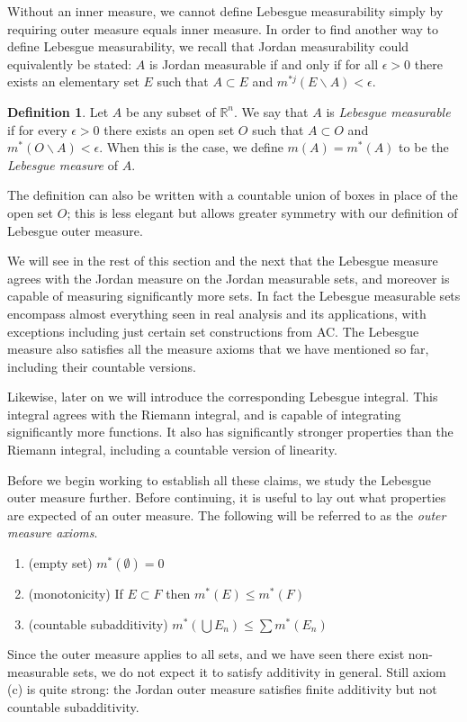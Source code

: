 \documentclass[11pt,oneside]{amsbook}
\renewcommand{\setminus}{\smallsetminus}
\newcommand{\RR}{{\mathbb R}}
\theoremstyle{definition}
\theoremstyle{plain}
\theoremstyle{definition}
\newtheorem{defn}[thm]{Definition}
\theoremstyle{remark}
\numberwithin{equation}{section}
\numberwithin{figure}{section}
\begin{document}
Without an inner measure, we cannot define Lebesgue measurability simply by requiring outer measure equals inner measure. In order to find another way to define Lebesgue measurability, we recall that Jordan measurability could equivalently be stated: $A$ is Jordan measurable if and only if for all $\epsilon>0$ there exists an elementary set $E$ such that $A\subset E$ and $m^{*j}(E\setminus A)<\epsilon$.

\begin{defn}
  Let $A$ be any subset of $\RR^n$. We say that $A$ is \emph{Lebesgue measurable} if for every $\epsilon>0$ there exists an open set $O$ such that $A\subset O$ and $m^*(O\setminus A)<\epsilon$. When this is the case, we define $m(A)=m^*(A)$ to be the \emph{Lebesgue measure} of $A$.
\end{defn}

The definition can also be written with a countable union of boxes in place of the open set $O$; this is less elegant but allows greater symmetry with our definition of Lebesgue outer measure.

We will see in the rest of this section and the next that the Lebesgue measure agrees with the Jordan measure on the Jordan measurable sets, and moreover is capable of measuring significantly more sets. In fact the Lebesgue measurable sets encompass almost everything seen in real analysis and its applications, with exceptions including just certain set constructions from AC.  The Lebesgue measure also satisfies all the measure axioms that we have mentioned so far, including their countable versions.

Likewise, later on we will introduce the corresponding Lebesgue integral. This integral agrees with the Riemann integral, and is capable of integrating significantly more functions. It also has significantly stronger properties than the Riemann integral, including a countable version of linearity.

Before we begin working to establish all these claims, we study the Lebesgue outer measure further. Before continuing, it is useful to lay out what properties are expected of an outer measure. The following will be referred to as the \emph{outer measure axioms}.
\begin{enumerate}
\item (empty set) $m^*(\emptyset)=0$
\item (monotonicity) If $E\subset F$ then $m^*(E)\leq m^*(F)$
\item (countable subadditivity) $m^*(\bigcup E_n)\leq\sum m^*(E_n)$
\end{enumerate}
Since the outer measure applies to all sets, and we have seen there exist non-measurable sets, we do not expect it to satisfy additivity in general. Still axiom (c) is quite strong: the Jordan outer measure satisfies finite additivity but not countable subadditivity.
\end{document}
